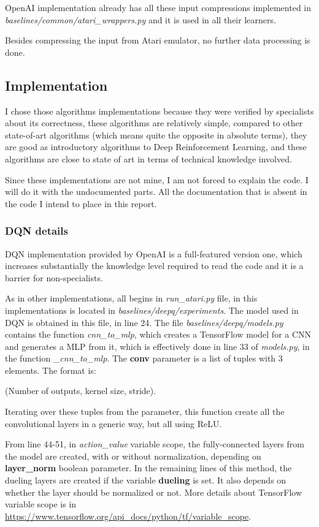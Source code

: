 \documentclass[11pt,twoside,a4paper]{article}
\begin{document}
OpenAI implementation already has all these input compressions implemented in
\textit{baselines/common/atari\_wrappers.py} and it is used in all their
learners.

Besides compressing the input from Atari emulator, no further data processing
is done.

\subsection*{Implementation}

I chose those algorithms implementations because they were verified by
specialists about its correctness, these algorithms are relatively simple,
compared to other state-of-art algorithms (which means quite the opposite in
absolute terms), they are good as introductory algorithms to Deep
Reinforcement Learning, and these algorithms are close to state of art in terms
of technical knowledge involved.

Since these implementations are not mine, I am not forced to explain the code. I
will do it with the undocumented parts. All the documentation that is absent in
the code I intend to place in this report.

\subsubsection*{DQN details}

DQN implementation provided by OpenAI is a full-featured version one, which
increases substantially the knowledge level required to read the code and it is
a barrier for non-specialists.

As in other implementations, all begins in \textit{run\_atari.py} file, in this
implementations is located in \textit{baselines/deepq/experiments}. The model
used in DQN is obtained in this file, in line 24. The file
\textit{baselines/deepq/models.py} contains the function \textit{cnn\_to\_mlp},
which creates a TensorFlow model for a CNN and generates a MLP from it, which
is effectively done in line 33 of \textit{models.py}, in the function
\textit{\_cnn\_to\_mlp}. The \textbf{conv} parameter is a list of tuples with 3
elements. The format is:

(Number of outputs, kernel size, stride).

Iterating over these tuples from the parameter, this function create all the
convolutional layers in a generic way, but all using ReLU.

From line 44-51, in
\textit{action\_value} variable scope, the fully-connected layers from the
model are created, with or without normalization, depending on
\textbf{layer\_norm} boolean parameter. In the remaining lines of this method,
the dueling layers are created if the variable \textbf{dueling} is set. It also
depends on whether the layer should be normalized or not. More details about
TensorFlow variable scope is in
\url{https://www.tensorflow.org/api_docs/python/tf/variable_scope}.
\end{document}
